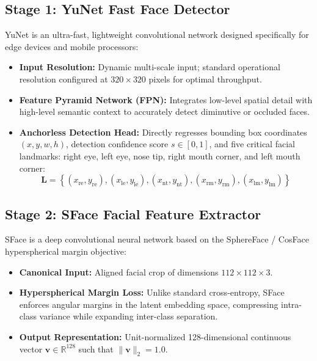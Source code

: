 \documentclass[12pt,a4paper,oneside]{report}
\begin{document}
\subsection{Stage 1: YuNet Fast Face Detector}
YuNet is an ultra-fast, lightweight convolutional network designed specifically for edge devices and mobile processors:
\begin{itemize}
    \item \textbf{Input Resolution:} Dynamic multi-scale input; standard operational resolution configured at $320 \times 320$ pixels for optimal throughput.
    \item \textbf{Feature Pyramid Network (FPN):} Integrates low-level spatial detail with high-level semantic context to accurately detect diminutive or occluded faces.
    \item \textbf{Anchorless Detection Head:} Directly regresses bounding box coordinates $(x, y, w, h)$, detection confidence score $s \in [0, 1]$, and five critical facial landmarks: right eye, left eye, nose tip, right mouth corner, and left mouth corner:
    \begin{equation}
    \mathbf{L} = \left\{ (x_{\text{re}}, y_{\text{re}}), (x_{\text{le}}, y_{\text{le}}), (x_{\text{nt}}, y_{\text{nt}}), (x_{\text{rm}}, y_{\text{rm}}), (x_{\text{lm}}, y_{\text{lm}}) \right\}
    \end{equation}
\end{itemize}

\subsection{Stage 2: SFace Facial Feature Extractor}
SFace is a deep convolutional neural network based on the SphereFace / CosFace hyperspherical margin objective:
\begin{itemize}
    \item \textbf{Canonical Input:} Aligned facial crop of dimensions $112 \times 112 \times 3$.
    \item \textbf{Hyperspherical Margin Loss:} Unlike standard cross-entropy, SFace enforces angular margins in the latent embedding space, compressing intra-class variance while expanding inter-class separation.
    \item \textbf{Output Representation:} Unit-normalized 128-dimensional continuous vector $\mathbf{v} \in \mathbb{R}^{128}$ such that $\|\mathbf{v}\|_2 = 1.0$.
\end{itemize}
\end{document}
